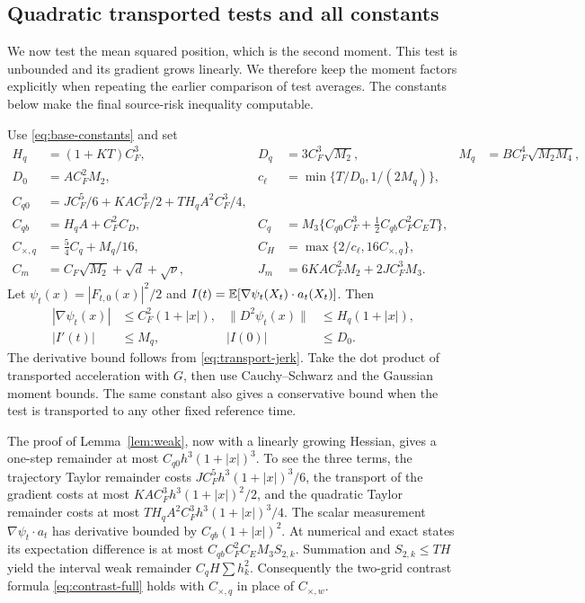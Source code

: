 \subsection{Quadratic transported tests and all constants}
We now test the mean squared position, which is the second moment. This
test is unbounded and its gradient grows linearly. We therefore keep the
moment factors explicitly when repeating the earlier comparison of test
averages. The constants below make the final source-risk inequality
computable.

Use \eqref{eq:base-constants} and set
\begin{align}
 H_q&=(1+KT)C_F^3, & D_q&=3C_F^3\sqrt{M_2}, & M_q&=BC_F^4\sqrt{M_2M_4},\\
 D_0&=AC_F^2M_2, & c_\ell&=\min\{T/D_0,1/(2M_q)\},\\
 C_{q0}&=JC_F^5/6+KAC_F^3/2+TH_qA^2C_F^3/4,\\
 C_{qb}&=H_qA+C_F^2C_D, &
 C_q&=M_3\{C_{q0}C_F^3+\tfrac12 C_{qb}C_F^2C_ET\},\\
 C_{\times,q}&=\tfrac54 C_q+M_q/16, &
 C_H&=\max\{2/c_\ell,16C_{\times,q}\},\\
 C_m&=C_F\sqrt{M_2}+\sqrt d+\sqrt\nu, &
 J_m&=6KAC_F^2M_2+2JC_F^3M_3.
 \label{eq:risk-constants}
\end{align}
Let $\psi_t(x)=|F_{t,0}(x)|^2/2$ and
$I(t)=\mathbb E[\nabla\psi_t(X_t)\cdot a_t(X_t)]$.
Then
\begin{align}
 |\nabla\psi_t(x)|&\le C_F^2(1+|x|), &
 \|D^2\psi_t(x)\|&\le H_q(1+|x|),\\
 |I'(t)|&\le M_q, & |I(0)|&\le D_0.
 \label{eq:quadratic-bounds}
\end{align}
The derivative bound follows from \eqref{eq:transport-jerk}. Take the dot
product of transported acceleration with $G$, then use Cauchy--Schwarz and
the Gaussian moment bounds. The same constant also gives a conservative
bound when the test is transported to any other fixed reference time.

The proof of Lemma~\ref{lem:weak}, now with a linearly growing Hessian,
gives a one-step remainder at most $C_{q0}h^3(1+|x|)^3$.
To see the three terms, the trajectory Taylor remainder costs
$JC_F^5h^3(1+|x|)^3/6$, the transport of the gradient costs at most
$KAC_F^3h^3(1+|x|)^2/2$, and the quadratic Taylor remainder costs at most
$TH_qA^2C_F^3h^3(1+|x|)^3/4$.
The scalar measurement $\nabla\psi_t\cdot a_t$ has derivative bounded by
$C_{qb}(1+|x|)^2$. At numerical and exact states its expectation difference
is at most $C_{qb}C_F^2C_EM_3S_{2,k}$.
Summation and $S_{2,k}\le TH$ yield the interval weak remainder
$C_qH\sum h_k^2$.
Consequently the two-grid contrast formula \eqref{eq:contrast-full} holds
with $C_{\times,q}$ in place of $C_{\times,w}$.

